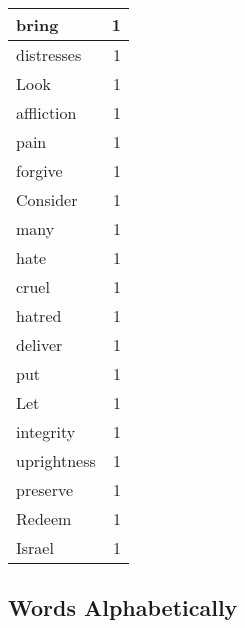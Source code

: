 \begin{center}
\begin{longtable}{l|r}
bring & 1 \\ \hline
distresses & 1 \\ \hline
Look & 1 \\ \hline
affliction & 1 \\ \hline
pain & 1 \\ \hline
forgive & 1 \\ \hline
Consider & 1 \\ \hline
many & 1 \\ \hline
hate & 1 \\ \hline
cruel & 1 \\ \hline
hatred & 1 \\ \hline
deliver & 1 \\ \hline
put & 1 \\ \hline
Let & 1 \\ \hline
integrity & 1 \\ \hline
uprightness & 1 \\ \hline
preserve & 1 \\ \hline
Redeem & 1 \\ \hline
Israel & 1 \\ \hline
\end{longtable}
\end{center}



\normalsize



\subsection{Words Alphabetically}

